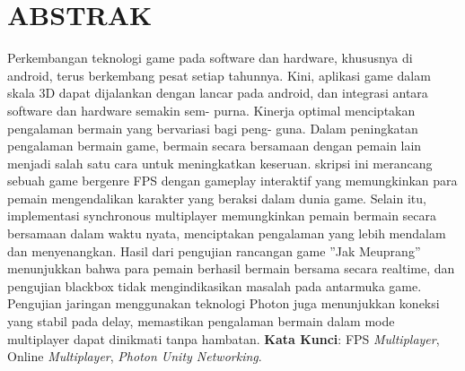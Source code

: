 \chapter*{ABSTRAK}
\noindent
Perkembangan teknologi game pada software dan hardware, khususnya di android, terus
berkembang pesat setiap tahunnya. Kini, aplikasi game dalam skala 3D dapat
dijalankan dengan lancar pada android, dan integrasi antara software dan hardware semakin sem-
purna. Kinerja optimal menciptakan pengalaman bermain yang bervariasi bagi peng-
guna. Dalam peningkatan pengalaman bermain game, bermain secara bersamaan
dengan pemain lain menjadi salah satu cara untuk meningkatkan keseruan. skripsi ini merancang sebuah game bergenre FPS dengan gameplay interaktif yang memungkinkan para pemain mengendalikan karakter yang beraksi dalam dunia game. Selain itu, implementasi synchronous multiplayer memungkinkan pemain bermain secara bersamaan dalam waktu nyata, menciptakan pengalaman yang lebih mendalam dan menyenangkan.
Hasil dari pengujian rancangan game ”Jak Meuprang” menunjukkan bahwa para
pemain berhasil bermain bersama secara realtime, dan pengujian blackbox tidak
mengindikasikan masalah pada antarmuka game. Pengujian jaringan menggunakan
teknologi Photon juga menunjukkan koneksi yang stabil pada delay, memastikan pengalaman
bermain dalam mode multiplayer dapat dinikmati tanpa hambatan.
\newline
\noindent \textbf{Kata Kunci}: FPS \textit{Multiplayer}, Online \textit{Multiplayer}, \textit{Photon Unity Networking}.